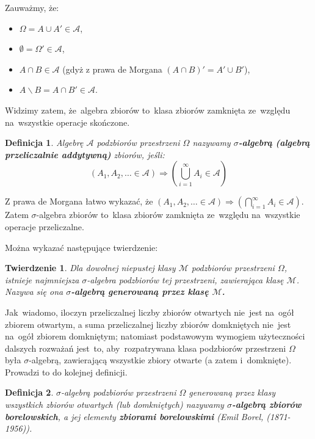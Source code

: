 \documentclass[10pt,a4paper]{article}
\newtheorem{definition}{Definicja}[section]
\newtheorem{theorem}{Twierdzenie}[section]
\begin{document}
Zauważmy, że:
\begin{itemize}
  \item $\Omega=A\cup A' \in \mathscr{A}$,
  \item $\emptyset=\Omega'\in\mathscr{A}$,
  \item $A\cap B\in\mathscr{A}$ (gdyż z prawa de Morgana $(A\cap B)'=A'\cup B'$),
  \item $A\backslash B=A\cap B' \in\mathscr{A}$.
\end{itemize}
Widzimy zatem, że~algebra zbiorów to~klasa zbiorów zamknięta ze~względu
na~wszystkie operacje skończone.

\begin{definition}
  Algebrę $\mathscr{A}$ podzbiorów przestrzeni $\Omega$ nazywamy
  \textbf{$\sigma$-algebrą (algebrą przeliczalnie addytywną)} zbiorów, jeśli:
  \begin{equation}
    \left(A_1, A_2,\dotsc \in \mathscr{A}\right) \Longrightarrow
    \left(\bigcup_{i=1}^{\infty}A_i\in\mathscr{A}\right)
  \end{equation}
\end{definition}
Z prawa de Morgana łatwo wykazać, że $(A_1, A_2,\dotsc\in \mathscr{A})
\Longrightarrow \left(\bigcap_{i=1}^{\infty}A_i\in\mathscr{A}\right)$. Zatem
$\sigma$-algebra zbiorów to~klasa zbiorów zamknięta ze~względu na~wszystkie
operacje przeliczalne.

Można wykazać następujące twierdzenie:
\begin{theorem}
  Dla dowolnej niepustej klasy $\mathscr{M}$ podzbiorów przestrzeni $\Omega$,
  istnieje najmniejsza $\sigma$-algebra podzbiorów tej przestrzeni,
  zawierająca klasę $\mathscr{M}$. Nazywa się ona \textbf{$\sigma$-algebrą
    generowaną przez klasę $\mathscr{M}$.}
\end{theorem}

Jak~wiadomo, iloczyn przeliczalnej liczby zbiorów otwartych nie~jest na~ogół
zbiorem otwartym, a suma przeliczalnej liczby zbiorów domkniętych nie~jest
na~ogół zbiorem domkniętym; natomiast podstawowym wymogiem użyteczności dalszych
rozważań jest~to, aby~rozpatrywana klasa podzbiorów przestrzeni $\Omega$ była
$\sigma$-algebrą, zawierającą wszystkie zbiory otwarte (a zatem i~domknięte).
Prowadzi to do kolejnej definicji.
\begin{definition}
  $\sigma$-algebrą podzbiorów przestrzeni $\Omega$ generowaną przez klasy
  wszystkich zbiorów otwartych (lub domkniętych) nazywamy \textbf{$\sigma$-algebrą
  zbiorów borelowskich}, a jej elementy \textbf{zbiorami borelowskimi}
  (Emil Borel, (1871-1956)).
\end{definition}
\end{document}
